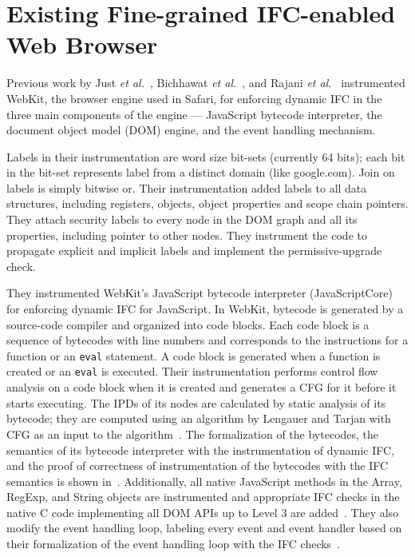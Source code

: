 \chapter{Existing Fine-grained IFC-enabled Web Browser}
\label{ch:impl}

Previous work by Just \emph{et al.}~\cite{just11PLASTIC}, Bichhawat 
\emph{et al.}~\cite{post14}, and Rajani \emph{et al.}~\cite{csf15} 
instrumented WebKit, the browser engine used in Safari, for enforcing 
dynamic IFC in the three main components of the engine --- JavaScript 
bytecode interpreter, the document object model (DOM) engine, and the
event handling mechanism. 

Labels in their instrumentation are word size bit-sets (currently 64 
bits); each bit in the bit-set represents label from a distinct domain
(like google.com). Join on labels is simply bitwise or. Their
instrumentation added labels to all data structures, including
registers, objects, object properties and scope chain pointers. They 
attach security labels to every node in the DOM graph and all its 
properties, including pointer to other nodes. 
They instrument the code to propagate explicit and implicit labels 
and implement the permissive-upgrade check. 

They instrumented WebKit’s JavaScript bytecode interpreter 
(JavaScriptCore) for enforcing dynamic IFC for JavaScript. 
In WebKit, bytecode is generated
by a source-code compiler and organized into code blocks. Each code
block is a sequence of bytecodes with line numbers and corresponds to
the instructions for a function or an \texttt{eval} statement. A code
block is generated when a function is created or an \texttt{eval} is
executed. Their instrumentation performs control flow analysis on a
code block when it is created and generates a CFG for it before it
starts executing. The IPDs of its nodes are calculated by static
analysis of its bytecode; they are computed using an algorithm by
Lengauer and Tarjan with CFG as an input to the
algorithm~\cite{Lengauer}. The formalization of the bytecodes, the
semantics of its bytecode interpreter with the instrumentation of
dynamic IFC, and the proof of correctness of instrumentation of the
bytecodes with the IFC semantics is shown in~\cite{post14Extended}.
Additionally, all native JavaScript methods in the Array, RegExp, 
and String objects are instrumented and appropriate  
IFC checks in the native C code implementing all DOM APIs up
to Level 3 are added~\cite{csf15}. 
They also modify the event handling loop, labeling every event and
event handler based on their formalization of the event handling loop
with the IFC checks~\cite{csf15}.  

